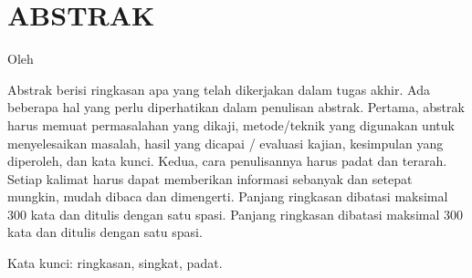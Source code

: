 \chapter*{ABSTRAK}

\begin{center}
	\center
	\begin{doublespace}
		\Large \bfseries \MakeUppercase{\thetitle}

		\normalfont \normalsize
		Oleh

		\theauthor
	\end{doublespace}
\end{center}

\begin{singlespace}
	Abstrak berisi ringkasan apa yang telah dikerjakan dalam tugas akhir. Ada
	beberapa hal yang perlu diperhatikan dalam penulisan abstrak. Pertama,
	abstrak harus memuat permasalahan yang dikaji, metode/teknik yang digunakan
	untuk menyelesaikan masalah, hasil yang dicapai / evaluasi kajian,
	kesimpulan yang diperoleh, dan kata kunci. Kedua, cara penulisannya harus
	padat dan terarah. Setiap kalimat harus dapat memberikan informasi sebanyak
	dan setepat mungkin, mudah dibaca dan dimengerti. Panjang ringkasan dibatasi
	maksimal 300 kata dan ditulis dengan satu spasi. Panjang ringkasan dibatasi
	maksimal 300 kata dan ditulis dengan satu spasi.

	Kata kunci: ringkasan, singkat, padat.
\end{singlespace}

\clearpage
